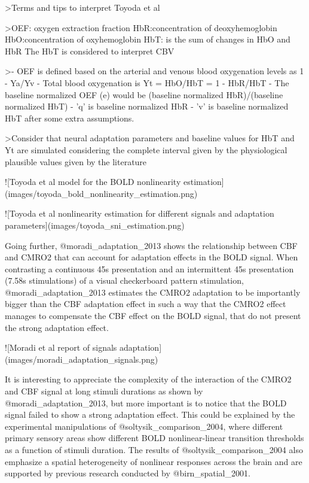 >Terms and tips to interpret Toyoda et al

>OEF: oxygen extraction fraction  
HbR:concentration of deoxyhemoglobin
HbO:concentration of oxyhemoglobin  
HbT: is the sum of changes in HbO and HbR  
The HbT is considered to interpret CBV

>- OEF is defined based on the arterial and venous blood oxygenation levels as 1 - Ya/Yv  
- Total blood oxygenation is Yt = HbO/HbT = 1 - HbR/HbT  
- The baseline normalized OEF (e) would be (baseline normalized HbR)/(baseline normalized HbT)  
- 'q' is baseline normalized HbR  
- 'v' is baseline normalized HbT after some extra assumptions.

>Consider that neural adaptation parameters and baseline values for HbT and Yt are simulated considering the complete interval given by the physiological plausible values given by the literature

![Toyoda et al model for the BOLD nonlinearity estimation](images/toyoda_bold_nonlinearity_estimation.png)

![Toyoda et al nonlinearity estimation for different signals and adaptation parameters](images/toyoda_sni_estimation.png)


Going further, @moradi_adaptation_2013 shows the relationship between CBF and CMRO2 that can account for adaptation effects in the BOLD signal. When contrasting a continuous 45s presentation and an intermittent 45s presentation (7.58s stimulations) of a visual checkerboard pattern stimulation, @moradi_adaptation_2013 estimates the CMRO2 adaptation to be importantly bigger than the CBF adaptation effect in such a way that the CMRO2 effect manages to compensate the CBF effect on the BOLD signal, that do not present the strong adaptation effect.

![Moradi et al report of signals adaptation](images/moradi_adaptation_signals.png)

It is interesting to appreciate the complexity of the interaction of the CMRO2 and CBF signal at long stimuli durations as shown by @moradi_adaptation_2013, but more important is to notice that the BOLD signal failed to show a strong adaptation effect. This could be explained by the experimental manipulations of @soltysik_comparison_2004, where different primary sensory areas show different BOLD nonlinear-linear transition thresholds as a function of stimuli duration. The results of @soltysik_comparison_2004 also emphasize a spatial heterogeneity of nonlinear responses across the brain and are supported by previous research conducted by @birn_spatial_2001. 

